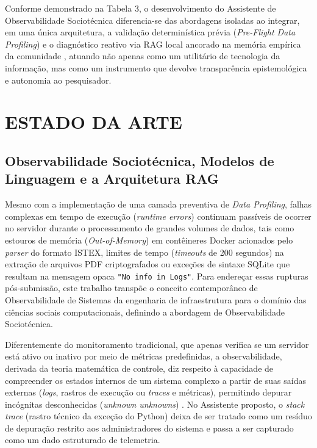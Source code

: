 \documentclass[
	oneside,
	a4paper,
	12pt,
	chapter=TITLE,
	section=TITLE,
	english,
	brazilian
]{abntex2}
\begin{document}
Conforme demonstrado na Tabela 3, o desenvolvimento do Assistente de Observabilidade Sociotécnica diferencia-se das abordagens isoladas ao integrar, em uma única arquitetura, a validação determinística prévia (\textit{Pre-Flight Data Profiling}) e o diagnóstico reativo via RAG local ancorado na memória empírica da comunidade \cite{CorText2026}, atuando não apenas como um utilitário de tecnologia da informação, mas como um instrumento que devolve transparência epistemológica e autonomia ao pesquisador.

\FloatBarrier
\section{ESTADO DA ARTE}\label{sec:estado_da_arte}


\FloatBarrier
\subsection{Observabilidade Sociotécnica, Modelos de Linguagem e a Arquitetura RAG}\label{sec:observabilidade_sociotecnica_modelos_de_}


Mesmo com a implementação de uma camada preventiva de \textit{Data Profiling}, falhas complexas em tempo de execução (\textit{runtime errors}) continuam passíveis de ocorrer no servidor durante o processamento de grandes volumes de dados, tais como estouros de memória (\textit{Out-of-Memory}) em contêineres Docker acionados pelo \textit{parser} do formato ISTEX, limites de tempo (\textit{timeouts} de 200 segundos) na extração de arquivos PDF criptografados ou exceções de sintaxe SQLite que resultam na mensagem opaca \texttt{"No info in Logs"}. Para endereçar essas rupturas pós-submissão, este trabalho transpõe o conceito contemporâneo de Observabilidade de Sistemas da engenharia de infraestrutura \cite{Majors2022} para o domínio das ciências sociais computacionais, definindo a abordagem de Observabilidade Sociotécnica.

Diferentemente do monitoramento tradicional, que apenas verifica se um servidor está ativo ou inativo por meio de métricas predefinidas, a observabilidade, derivada da teoria matemática de controle, diz respeito à capacidade de compreender os estados internos de um sistema complexo a partir de suas saídas externas (\textit{logs}, rastros de execução ou \textit{traces} e métricas), permitindo depurar incógnitas desconhecidas (\textit{unknown unknowns}) \cite{Majors2022}. No Assistente proposto, o \textit{stack trace} (rastro técnico da exceção do Python) deixa de ser tratado como um resíduo de depuração restrito aos administradores do sistema e passa a ser capturado como um dado estruturado de telemetria.
\end{document}
